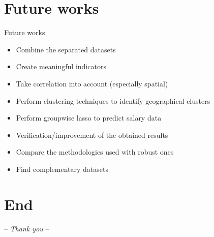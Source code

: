 \documentclass[xcolor=dvipsnames]{beamer}
\begin{document}
\section{Future works}
		\begin{frame}{\vskip 0.05cm\centerline{\Huge\textcolor{bscuro}{Future works}}}

\begin{itemize}
	\item Combine the separated datasets
	\item Create meaningful indicators
	\item Take correlation into account (especially spatial)
	\item Perform clustering techniques to identify geographical clusters
	\item Perform groupwise lasso to predict salary data
	\item Verification/improvement of the obtained results 
	\item Compare the methodologies used with robust ones
	\item Find complementary datasets
\end{itemize}

\end{frame}		
	
\section{End}
	\begin{frame}
	\centerline{\Huge\textcolor{bscuro}{ -- \emph{Thank you} -- }}
\end{frame}
\end{document}
